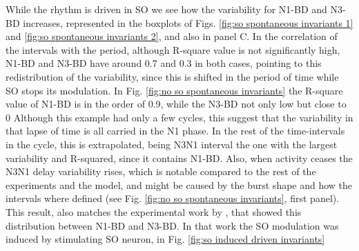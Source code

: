While the rhythm is driven in SO we see how the variability for N1-BD and N3-BD increases, represented in the boxplots of Figs. \ref{fig:so spontaneous invariants 1} and \ref{fig:so spontaneous invariants 2}, and also in panel C. In the correlation of the intervals with the period, although R-square value is not significantly high, N1-BD and N3-BD have around 0.7 and 0.3 in both cases, pointing to this redistribution of the variability, since this is shifted in the period of time while SO stops its modulation. In Fig. \ref{fig:no so spontaneous invariants} the R-square value of N1-BD is in the order of 0.9, while the N3-BD not only low but close to 0 Although this example had only a few cycles, this suggest that the variability in that lapse of time is all carried in the N1 phase.  In the rest of the time-intervals in the cycle, this is extrapolated, being N3N1 interval the one with the largest variability and R-squared, since it contains N1-BD. Also, when activity ceases the N3N1 delay variability rises, which is notable compared to the rest of the experiments and the model, and might be caused by the burst shape and how the intervals where defined (see Fig. \ref{fig:no so spontaneous invariants}, first panel). This result, also matches the experimental work by \cite{elliott_temporal_1991}, that showed this distribution between N1-BD and N3-BD. In that work the SO modulation was induced by stimulating SO neuron, in Fig. \ref{fig:so induced driven invariants}

 
